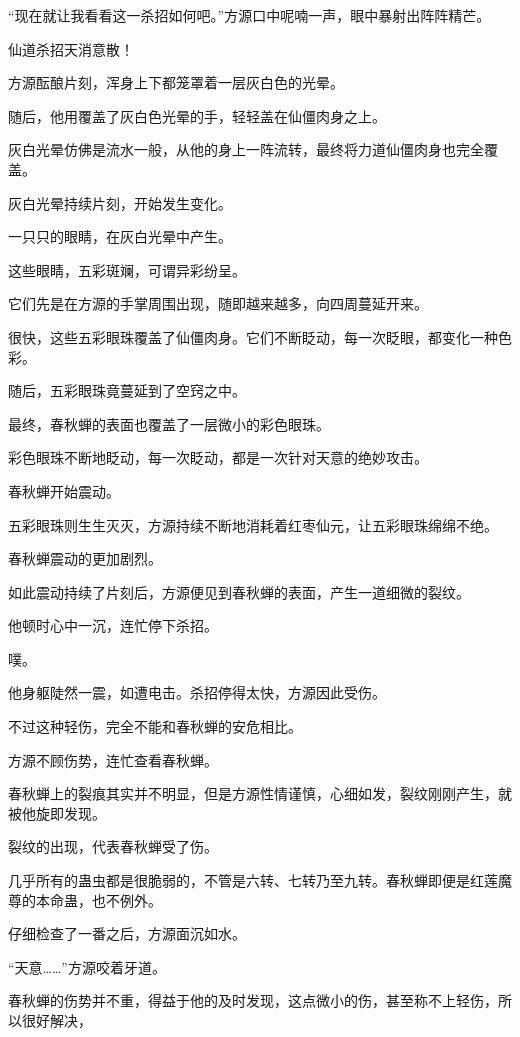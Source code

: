 \begin{this_body}
“现在就让我看看这一杀招如何吧。”方源口中呢喃一声，眼中暴射出阵阵精芒。

仙道杀招天消意散！

方源酝酿片刻，浑身上下都笼罩着一层灰白色的光晕。

随后，他用覆盖了灰白色光晕的手，轻轻盖在仙僵肉身之上。

灰白光晕仿佛是流水一般，从他的身上一阵流转，最终将力道仙僵肉身也完全覆盖。

灰白光晕持续片刻，开始发生变化。

一只只的眼睛，在灰白光晕中产生。

这些眼睛，五彩斑斓，可谓异彩纷呈。

它们先是在方源的手掌周围出现，随即越来越多，向四周蔓延开来。

很快，这些五彩眼珠覆盖了仙僵肉身。它们不断眨动，每一次眨眼，都变化一种色彩。

随后，五彩眼珠竟蔓延到了空窍之中。

最终，春秋蝉的表面也覆盖了一层微小的彩色眼珠。

彩色眼珠不断地眨动，每一次眨动，都是一次针对天意的绝妙攻击。

春秋蝉开始震动。

五彩眼珠则生生灭灭，方源持续不断地消耗着红枣仙元，让五彩眼珠绵绵不绝。

春秋蝉震动的更加剧烈。

如此震动持续了片刻后，方源便见到春秋蝉的表面，产生一道细微的裂纹。

他顿时心中一沉，连忙停下杀招。

噗。

他身躯陡然一震，如遭电击。杀招停得太快，方源因此受伤。

不过这种轻伤，完全不能和春秋蝉的安危相比。

方源不顾伤势，连忙查看春秋蝉。

春秋蝉上的裂痕其实并不明显，但是方源性情谨慎，心细如发，裂纹刚刚产生，就被他旋即发现。

裂纹的出现，代表春秋蝉受了伤。

几乎所有的蛊虫都是很脆弱的，不管是六转、七转乃至九转。春秋蝉即便是红莲魔尊的本命蛊，也不例外。

仔细检查了一番之后，方源面沉如水。

“天意……”方源咬着牙道。

春秋蝉的伤势并不重，得益于他的及时发现，这点微小的伤，甚至称不上轻伤，所以很好解决，


\end{this_body}
